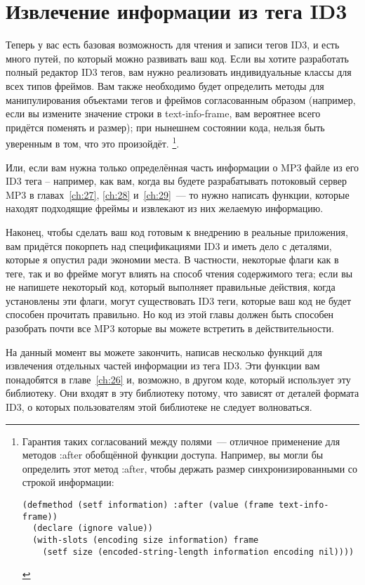 \section{Извлечение информации из тега ID3}

Теперь у вас есть базовая возможность для чтения и записи тегов ID3, и есть много путей,
по который можно развивать ваш код. Если вы хотите разработать полный редактор ID3 тегов,
вам нужно реализовать индивидуальные классы для всех типов фреймов. Вам также необходимо
будет определить методы для манипулирования объектами тегов и фреймов согласованным
образом (например, если вы измените значение строки в text-info-frame, вам вероятнее всего
придётся поменять и размер); при нынешнем состоянии кода, нельзя быть уверенным в том, что
это произойдёт. \footnote{Гарантия таких согласований между полями~--- отличное применение
  для методов :after обобщённой функции доступа. Например, вы могли бы определить этот
  метод :after, чтобы держать размер синхронизированными со строкой информации:

\begin{lstlisting}
(defmethod (setf information) :after (value (frame text-info-frame))
  (declare (ignore value))
  (with-slots (encoding size information) frame
    (setf size (encoded-string-length information encoding nil))))
\end{lstlisting}
}.

Или, если вам нужна только определённая часть информации о MP3 файле из его ID3 тега --
например, как вам, когда вы будете разрабатывать потоковый сервер MP3 в
главах~\ref{ch:27}, \ref{ch:28} и~\ref{ch:29}~--- то нужно написать функции, которые
находят подходящие фреймы и извлекают из них желаемую информацию.

Наконец, чтобы сделать ваш код готовым к внедрению в реальные приложения, вам придётся
покорпеть над спецификациями ID3 и иметь дело с деталями, которые я опустил ради экономии
места. В частности, некоторые флаги как в теге, так и во фрейме могут влиять на способ
чтения содержимого тега; если вы не напишете некоторый код, который выполняет правильные
действия, когда установлены эти флаги, могут существовать ID3 теги, которые ваш код не
будет способен прочитать правильно. Но код из этой главы должен быть способен разобрать
почти все MP3 которые вы можете встретить в действительности.

На данный момент вы можете закончить, написав несколько функций для извлечения отдельных
частей информации из тега ID3. Эти функции вам понадобятся в главе~\ref{ch:26} и,
возможно, в другом коде, который использует эту библиотеку. Они входят в эту библиотеку
потому, что зависят от деталей формата ID3, о которых пользователям этой библиотеке не
следует волноваться.

